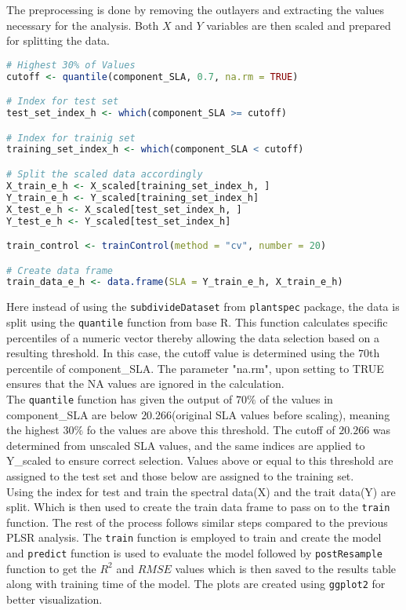 \documentclass[12pt,a4paper]{report}
\begin{document}
The preprocessing is done by removing the outlayers and extracting the values necessary for the analysis. Both $X$ and $Y$ variables are then scaled and prepared for splitting the data. \\

\begin{lstlisting}[language=R, style=mystyle]
# Highest 30% of Values
cutoff <- quantile(component_SLA, 0.7, na.rm = TRUE)

# Index for test set
test_set_index_h <- which(component_SLA >= cutoff)

# Index for trainig set
training_set_index_h <- which(component_SLA < cutoff)

# Split the scaled data accordingly
X_train_e_h <- X_scaled[training_set_index_h, ]
Y_train_e_h <- Y_scaled[training_set_index_h]
X_test_e_h <- X_scaled[test_set_index_h, ]
Y_test_e_h <- Y_scaled[test_set_index_h]

train_control <- trainControl(method = "cv", number = 20)

# Create data frame 
train_data_e_h <- data.frame(SLA = Y_train_e_h, X_train_e_h)
\end{lstlisting}

 Here instead of using the \texttt{subdivideDataset} from \texttt{plantspec} package, the data is split using the \texttt{quantile} function from base R. This function calculates specific percentiles of a numeric vector thereby allowing the data selection based on a resulting threshold. In this case, the cutoff value is determined using the $70$th percentile of component\_SLA. The parameter "na.rm", upon setting to TRUE ensures that the NA values are ignored in the calculation.\\

 The \texttt{quantile} function has given the output of $70\%$ of the values in component\_SLA are below $20.266$(original SLA values before scaling), meaning the highest $30\%$ fo the values are above this threshold. The cutoff of $20.266$ was determined from unscaled SLA values, and the same indices are applied to Y\_scaled to ensure correct selection. Values above or equal to this threshold are assigned to the test set and those below are assigned to the training set. \\

Using the index for test and train the spectral data(X) and the trait data(Y) are split. Which is then used to create the train data frame to pass on to the \texttt{train} function. The rest of the process follows similar steps compared to the previous PLSR analysis. The \texttt{train} function is employed to train and create the model and \texttt{predict} function is used to evaluate the model followed by \texttt{postResample} function to get the $R^2$ and $RMSE$ values which is then saved to the results table along with training time of the model. The plots are created using \texttt{ggplot2} for better visualization.
\end{document}
